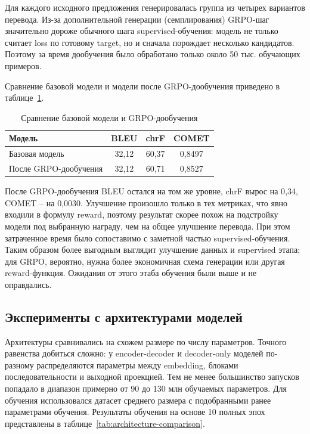 Для каждого исходного предложения генерировалась группа из четырех вариантов перевода. Из-за дополнительной генерации (семплирования) GRPO-шаг значительно дороже обычного шага supervised-обучения: модель не только считает loss по готовому target, но и сначала порождает несколько кандидатов.
Поэтому за время дообучения было обработано только около 50 тыс. обучающих примеров.

Сравнение базовой модели и модели после GRPO-дообучения приведено в таблице~\ref{tab:grpo-comparison}.

\begin{table}[H]
	\centering
	\caption{Сравнение базовой модели и GRPO-дообучения}
	\label{tab:grpo-comparison}
	\begin{tabular}{|p{}|c|c|c|}
		\hline
		\textbf{Модель}       & \textbf{BLEU} & \textbf{chrF} & \textbf{COMET} \\
		\hline
		Базовая модель        & 32{,}12       & 60{,}37       & 0{,}8497       \\
		\hline
		После GRPO-дообучения & 32{,}12       & 60{,}71       & 0{,}8527       \\
		\hline
	\end{tabular}
\end{table}

После GRPO-дообучения BLEU остался на том же уровне, chrF вырос на 0{,}34, COMET -- на 0{,}0030. Улучшение произошло только в тех метриках, что явно входили в формулу reward, поэтому результат скорее похож на подстройку модели под выбранную награду, чем на общее улучшение перевода.
При этом затраченное время было сопоставимо с заметной частью supervised-обучения.
Таким образом более выгодным выглядит улучшение данных и supervised этапа; для GRPO, вероятно, нужна более экономичная схема генерации или другая reward-функция.
Ожидания от этого этаба обучения были выше и не оправдались.

\subsection{Эксперименты с архитектурами моделей}

Архитектуры сравнивались на схожем размере по числу параметров. Точного равенства добиться сложно: у encoder-decoder и decoder-only моделей по-разному распределяются параметры между embedding, блоками последовательности и выходной проекцией. Тем не менее большинство запусков попадало в диапазон примерно от 90 до 130 млн обучаемых параметров. Для обучения использовался датасет среднего размера с подобранными ранее параметрами обучения.
Результаты обучения на основе 10 полных эпох представлены в таблице~\ref{tab:architecture-comparison}.

